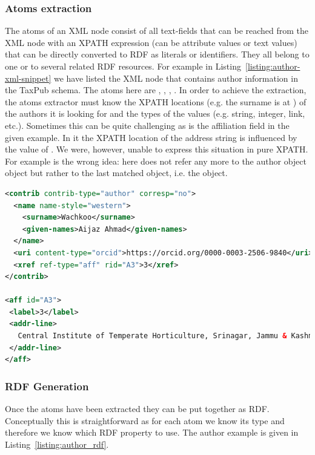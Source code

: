 \subsubsection{Atoms extraction}

The atoms of an XML node consist of all text-fields that can be reached from the XML node with an XPATH expression (can be attribute values or text values) that can be directly converted to RDF as literals or identifiers. They all belong to one or to several related RDF resources. For example in Listing~\ref{listing:author-xml-snippet} we have listed the XML node that contains author information in the TaxPub schema. The atoms here are , , , . In order to achieve the extraction, the atoms extractor must know the XPATH locations (e.g. the surname is at ) of the authors it is looking for and the types of the values (e.g. string, integer, link, etc.). Sometimes this can be quite challenging as is the affiliation field in the given example. In it the XPATH location of the address string is influenced by the value of . We were, however, unable to express this situation in pure XPATH. For example  is the wrong idea: here  does not refer any more to the author object object but rather to the last matched object, i.e. the  object.

\begin{lstlisting}[language=XML,
caption=XML snippet of an author.,
label=listing:author-xml-snippet, basicstyle=\ttfamily\tiny]
<contrib contrib-type="author" corresp="no">
  <name name-style="western">
    <surname>Wachkoo</surname>
    <given-names>Aijaz Ahmad</given-names>
  </name>
  <uri content-type="orcid">https://orcid.org/0000-0003-2506-9840</uri>
  <xref ref-type="aff" rid="A3">3</xref>
</contrib>  

<aff id="A3">
 <label>3</label>
 <addr-line>
   Central Institute of Temperate Horticulture, Srinagar, Jammu & Kashmir, India
 </addr-line>
</aff>
\end{lstlisting}

\subsubsection{RDF Generation}

Once the atoms have been extracted they can be put together as RDF. Conceptually this is straightforward as for each atom we know its type  and therefore we know which RDF property to use. The author example is given in Listing~\ref{listing:author_rdf}.

